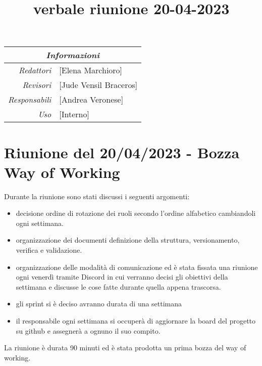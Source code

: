 \documentclass[12pt]{article}
\begin{document}
\graphicspath{ {../../templates/img} }

\title{verbale riunione 20-04-2023}

\firstPage

\maketitle
\begin{center}
    \begin{tabular}{r | l}
		\multicolumn{2}{c}{\textit{Informazioni}}\\
		\hline
		
			\textit{Redattori} &
			[Elena Marchioro]\makecell{}\\
		
			\textit{Revisori} &
			[Jude Vensil Braceros]\makecell{}\\
			\textit{Responsabili} &
			[Andrea Veronese]\makecell{}\\
		      \textit{Uso} & 
                [Interno]\makecell{}\\
\end{tabular}
\end{center}


\tableofcontents
\printindex 
\section{Riunione del 20/04/2023 - Bozza Way of Working}
Durante la riunione sono stati discussi i seguenti argomenti:
\begin{itemize}
    \item decisione ordine di rotazione dei ruoli secondo l'ordine alfabetico cambiandoli ogni settimana.
    \item organizzazione dei documenti definizione della struttura, versionamento, verifica e validazione.
    \item organizzazione delle modalità di comunicazione ed è stata fissata una riunione ogni venerdì tramite Discord in cui verranno decisi gli obiettivi della settimana e discusse le cose fatte durante quella appena trascorsa.
    \item gli sprint si è deciso avranno durata di una settimana
    \item il responsabile ogni settimana si occuperà di aggiornare la board del progetto su github e assegnerà a ognuno il suo compito.
\end{itemize}
La riunione è durata 90 minuti ed è stata prodotta un prima bozza del way of working.
\end{document}

